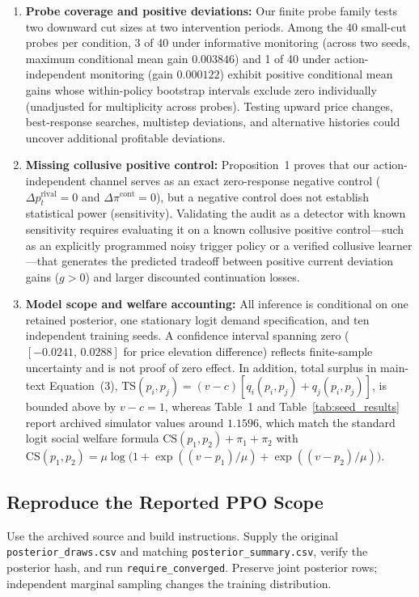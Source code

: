 \begin{enumerate}
\item \textbf{Probe coverage and positive deviations:} Our finite probe family tests two downward cut sizes at two intervention periods. Among the 40 small-cut probes per condition, 3 of 40 under informative monitoring (across two seeds, maximum conditional mean gain $0.003846$) and 1 of 40 under action-independent monitoring (gain $0.000122$) exhibit positive conditional mean gains whose within-policy bootstrap intervals exclude zero individually (unadjusted for multiplicity across probes). Testing upward price changes, best-response searches, multistep deviations, and alternative histories could uncover additional profitable deviations.
\item \textbf{Missing collusive positive control:} Proposition~1 proves that our action-independent channel serves as an exact zero-response negative control ($\Delta p_t^{\mathrm{rival}}=0$ and $\Delta\pi^{\mathrm{cont}}=0$), but a negative control does not establish statistical power (sensitivity). Validating the audit as a detector with known sensitivity requires evaluating it on a known collusive positive control---such as an explicitly programmed noisy trigger policy or a verified collusive learner---that generates the predicted tradeoff between positive current deviation gains ($g>0$) and larger discounted continuation losses.
\item \textbf{Model scope and welfare accounting:} All inference is conditional on one retained posterior, one stationary logit demand specification, and ten independent training seeds. A confidence interval spanning zero ($[-0.0241,\,0.0288]$ for price elevation difference) reflects finite-sample uncertainty and is not proof of zero effect. In addition, total surplus in main-text Equation~(3), $\mathrm{TS}(p_i,p_j)=(v-c)[q_i(p_i,p_j)+q_j(p_i,p_j)]$, is bounded above by $v-c=1$, whereas Table~1 and Table~\ref{tab:seed_results} report archived simulator values around $1.1596$, which match the standard logit social welfare formula $\mathrm{CS}(p_1,p_2)+\pi_1+\pi_2$ with $\mathrm{CS}(p_1,p_2)=\mu\log\bigl(1+\exp((v-p_1)/\mu)+\exp((v-p_2)/\mu)\bigr)$.
\end{enumerate}

\subsection{Reproduce the Reported PPO Scope}

Use the archived source and build instructions. Supply the original \texttt{posterior\_draws.csv} and matching \texttt{posterior\_summary.csv}, verify the posterior hash, and run \texttt{require\_converged}. Preserve joint posterior rows; independent marginal sampling changes the training distribution.

